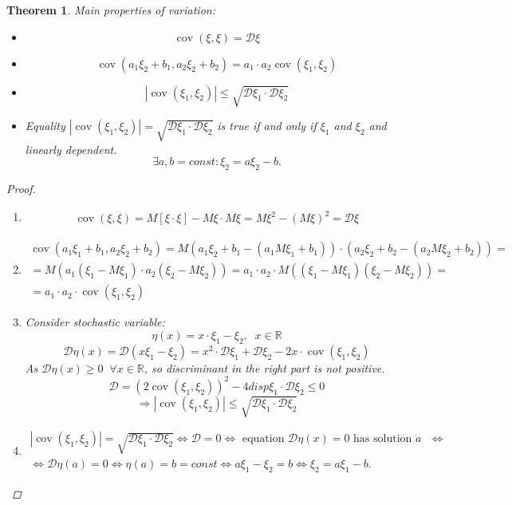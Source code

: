 \documentclass[12pt,letterpaper]{report}
\newtheorem{theorem}{Theorem}[section]
\DeclareMathOperator{\cov}{cov}
\begin{document}
\begin{theorem}
    Main properties of variation:
    \begin{itemize}
        \item[1.] \[ \cov(\xi, \xi) = \mathcal{D}\xi \]
        \item[2.] \[ \cov(a_1 \xi_2 + b_1, a_2 \xi_2 + b_2) = a_1 \cdot a_2 \cov(\xi_1, \xi_2) \]
        \item[3.] \[ |\cov(\xi_1, \xi_2)| \leq \sqrt{\mathcal{D}\xi_1\cdot \mathcal{D}\xi_2} \]
        \item[4.] Equality $|\cov(\xi_1, \xi_2)| = \sqrt{\mathcal{D}\xi_1 \cdot \mathcal{D}\xi_2}$ is true if and only if $\xi_1$ and $\xi_2$ and linearly dependent.
            \[
                \exists a, b = const : \xi_2 = a \xi_2 - b
            .\] 
    \end{itemize}
    \begin{proof}
        \begin{enumerate}
            \item
                \begin{gather*}
                    \cov(\xi, \xi) = M[\xi \cdot \xi] - M\xi \cdot M\xi = M\xi^2 - (M\xi)^2 = \mathcal{D}\xi
                \end{gather*}
            \item
                \begin{gather*}
                    \cov(a_1\xi_1 + b_1, a_2\xi_2 + b_2) = M(a_1\xi_2 + b_1 - (a_1 M\xi_1 + b_1)) \cdot (a_2\xi_2+b_2-(a_2M\xi_2+b_2)) = \\
                    = M(a_1(\xi_1-M\xi_1)\cdot a_2(\xi_2 -M\xi_2)) = 
                    a_1\cdot a_2 \cdot M((\xi_1 -M\xi_1)(\xi_2 - M\xi_2)) = \\
                    = a_1 \cdot a_2\cdot \cov(\xi_1, \xi_2)
                \end{gather*}
            \item Consider stochastic variable:
                \[ \eta(x) = x\cdot \xi_1 - \xi_2, \;\; x\in \mathbb{R} \]
                \[ \mathcal{D}\eta(x) = \mathcal{D}(x\xi_1 - \xi_2) = x^2 \cdot \mathcal{D}\xi_1 + \mathcal{D}\xi_2 - 2x \cdot \cov(\xi_1,  \xi_2) \]
                As $\mathcal{D}\eta(x) \geq 0 \;\; \forall x \in \mathbb{R}$, so discriminant in the right part is not positive.
                \[ \mathcal{D} = (2\cov(\xi_1, \xi_2))^2 - 4disp\xi_1\cdot \mathcal{D}\xi_2 \leq 0 \]
                \[  \Rightarrow |\cov(\xi_1, \xi_2)| \leq \sqrt{\mathcal{D}\xi_1 \cdot \mathcal{D}\xi_2} \]
            \item 
                \begin{gather*}
                    |\cov(\xi_1, \xi_2)| = \sqrt{\mathcal{D}\xi_1\cdot \mathcal{D}\xi_2} \iff \mathcal{D} = 0 \iff \text{ equation $\mathcal{D}\eta(x)=0$ has solution $a$ } \iff \\
                    \iff \mathcal{D}\eta(a) = 0 \iff \eta(a) = b = const \iff
                    a\xi_1 - \xi_2 = b \iff \xi_2 = a\xi_1 - b.
                \end{gather*}
        \end{enumerate}
    \end{proof}


\end{theorem}
\end{document}
